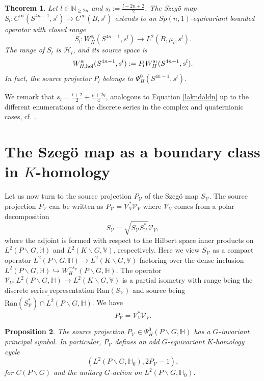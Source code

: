 \documentclass[a4paper,reqno]{amsart}
\numberwithin{equation}{section}
\def\N{\mathbb{N}}
\newtheorem{thm}{Theorem}[section]
\newtheorem{prop}[thm]{Proposition}
\theoremstyle{definition}
\theoremstyle{remark}
\begin{document}
\begin{thm}
Let $l\in \N_{\geq 2n}$ and $s_l:=\frac{l-2n+2}{2}$. The Szegö map $S_l:C^\infty(S^{4n-1},s^l)\to C^\infty(B,s^l)$ extends to an $Sp(n,1)$-equivariant bounded operator with closed range
$$S_l:W^{s_l}_H(S^{4n-1},s^l)\to L^2(B,\mu_l,s^l).$$
The range of $S_l$ is $\mathcal{H}_l$, and its source space is 
$$W^{s_l}_{H,{\rm hol}}(S^{4n-1},s^l):= P_lW^{s_l}_H(S^{4n-1},s^l).$$ 
In fact, the source projector $P_l$ belongs to $\Psi^0_H(S^{4n-1},s^l)$.
\end{thm}

We remark that $s_l=\frac{l+2}{2}+\frac{p+2q}{4}$, analogous to Equation \eqref{lakndaldn} up to the different enumerations of the discrete series in the complex and quaternionic cases, cf. \cite[Footnote on page 2986]{liuzhang}.


\section{The Szegö map as a boundary class in $K$-homology}
\label{szkhom}

Let us now turn to the source projection $P_{\mathcal{V}}$ of the Szegö map $S_{\mathcal{V}}$. The source projection $P_{\mathcal{V}}$ can be written as $P_{\mathcal{V}}=\mathcal{V}_V^*\mathcal{V}_V$ where $\mathcal{V}_V$ comes from a polar decomposition
$$S_{\mathcal{V}}=\sqrt{S_{\mathcal{V}}S_{\mathcal{V}}^*}\mathcal{V}_V,$$
where the adjoint is formed with respect to the Hilbert space inner products on $L^2(P\backslash G, \mathbb{H})$ and $L^2(K\backslash G,\mathbb{V})$, respectively. Here we view $S_{\mathcal{V}}$ as a compact operator $L^2(P\backslash G, \mathbb{H})\to L^2(K\backslash G,\mathbb{V})$ factoring over the dense inclusion $L^2(P\backslash G, \mathbb{H})\hookrightarrow W^{-s_\mathcal{V}}_H(P\backslash G, \mathbb{H})$. The operator $\mathcal{V}_V:L^2(P\backslash G, \mathbb{H})\to L^2(K\backslash G,\mathbb{V})$ is a partial isometry with range being the discrete series representation $\overline{\mathrm{Ran}(S_{\mathcal{V}})}$ and source being $\overline{\mathrm{Ran}(S_{\mathcal{V}}^*)\cap L^2(P\backslash G, \mathbb{H})}$. We have 
$$P_{\mathcal{V}}=\mathcal{V}_V^*\mathcal{V}_V.$$

\begin{prop}
\label{knadkna}
The source projection $P_{\mathcal{V}}\in \Psi^0_{H}(P\backslash G,\mathbb{H})$ has a $G$-invariant principal symbol. In particular, $P_{\mathcal{V}}$ defines an odd $G$-equivariant $K$-homology cycle 
$$(L^2(P\backslash G,\mathbb{H}_0),2P_{\mathcal{V}}-1),$$ 
for $C(P\backslash G)$ and the unitary $G$-action on $L^2(P\backslash G,\mathbb{H}_0)$.
\end{prop}
\end{document}
